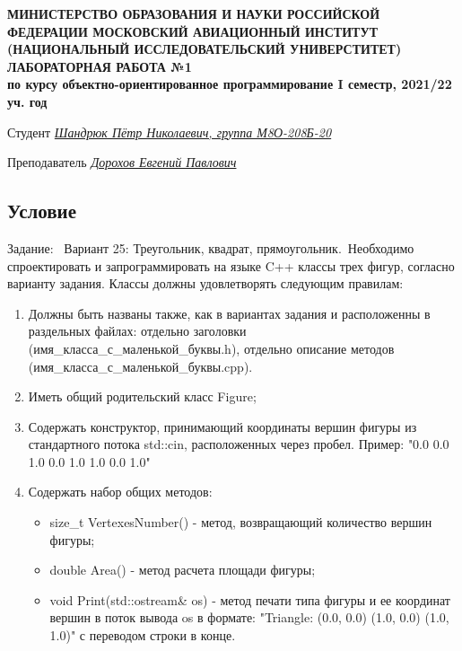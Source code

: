 \documentclass[12pt]{article}
\begin{document}
\begin{titlepage}
\begin{center}
\textbf{МИНИСТЕРСТВО ОБРАЗОВАНИЯ И НАУКИ РОССИЙСКОЙ ФЕДЕРАЦИИ
\medskip
МОСКОВСКИЙ АВИАЦИОННЫЙ ИНСТИТУТ
(НАЦИОНАЛЬНЫЙ ИССЛЕДОВАТЕЛЬСКИЙ УНИВЕРСТИТЕТ)
\vfill\vfill
{\Huge ЛАБОРАТОРНАЯ РАБОТА №1} \\
по курсу объектно-ориентированное программирование
I семестр, 2021/22 уч. год}
\end{center}
\vfill

Студент \uline{\it {Шандрюк Пётр Николаевич, группа М8О-208Б-20}\hfill}

Преподаватель \uline{\it {Дорохов Евгений Павлович}\hfill}

\vfill
\end{titlepage}

\subsection*{Условие}

Задание: \
Вариант 25: Треугольник, квадрат, прямоугольник.\
Необходимо спроектировать и запрограммировать на языке C++ классы трех фигур, согласно варианту задания. Классы должны удовлетворять следующим правилам:
\begin{enumerate}
\item Должны быть названы также, как в вариантах задания и расположенны в раздельных файлах: отдельно заголовки (имя\_класса\_с\_маленькой\_буквы.h), отдельно описание методов (имя\_класса\_с\_маленькой\_буквы.cpp).
\item Иметь общий родительский класс Figure;
\item Содержать конструктор, принимающий координаты вершин фигуры из стандартного потока std::cin, расположенных через пробел. Пример: "0.0 0.0 1.0 0.0 1.0 1.0 0.0 1.0"
\item Содержать набор общих методов:
\begin{itemize}
    \item size\_t VertexesNumber() - метод, возвращающий количество вершин фигуры;
    \item double Area() - метод расчета площади фигуры;
    \item void Print(std::ostream& os) - метод печати типа фигуры и ее координат вершин в поток вывода os в формате: "Triangle: (0.0, 0.0) (1.0, 0.0) (1.0, 1.0)" с переводом строки в конце.
\end{itemize}
\end{enumerate}
\end{document}
